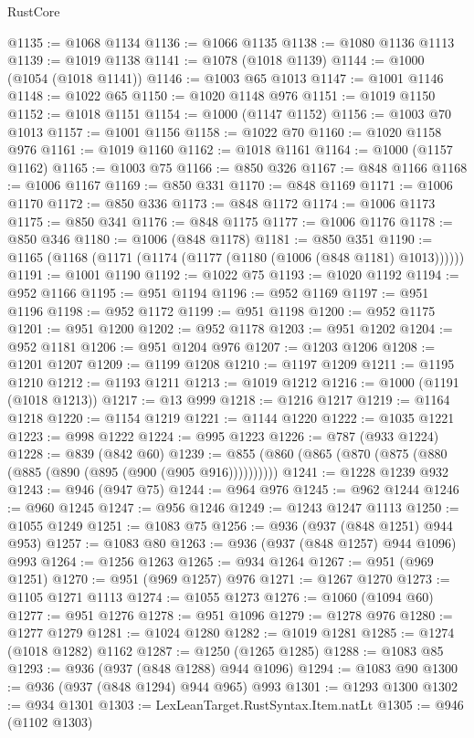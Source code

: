 \begin{lexlean}{RustCore}
\begin{coremodule}
@1135 := @1068 @1134
@1136 := @1066 @1135
@1138 := @1080 @1136 @1113
@1139 := @1019 @1138
@1141 := @1078 (@1018 @1139)
@1144 := @1000 (@1054 (@1018 @1141))
@1146 := @1003 @65 @1013
@1147 := @1001 @1146
@1148 := @1022 @65
@1150 := @1020 @1148 @976
@1151 := @1019 @1150
@1152 := @1018 @1151
@1154 := @1000 (@1147 @1152)
@1156 := @1003 @70 @1013
@1157 := @1001 @1156
@1158 := @1022 @70
@1160 := @1020 @1158 @976
@1161 := @1019 @1160
@1162 := @1018 @1161
@1164 := @1000 (@1157 @1162)
@1165 := @1003 @75
@1166 := @850 @326
@1167 := @848 @1166
@1168 := @1006 @1167
@1169 := @850 @331
@1170 := @848 @1169
@1171 := @1006 @1170
@1172 := @850 @336
@1173 := @848 @1172
@1174 := @1006 @1173
@1175 := @850 @341
@1176 := @848 @1175
@1177 := @1006 @1176
@1178 := @850 @346
@1180 := @1006 (@848 @1178)
@1181 := @850 @351
@1190 := @1165 (@1168 (@1171 (@1174 (@1177 (@1180 (@1006 (@848 @1181) @1013))))))
@1191 := @1001 @1190
@1192 := @1022 @75
@1193 := @1020 @1192
@1194 := @952 @1166
@1195 := @951 @1194
@1196 := @952 @1169
@1197 := @951 @1196
@1198 := @952 @1172
@1199 := @951 @1198
@1200 := @952 @1175
@1201 := @951 @1200
@1202 := @952 @1178
@1203 := @951 @1202
@1204 := @952 @1181
@1206 := @951 @1204 @976
@1207 := @1203 @1206
@1208 := @1201 @1207
@1209 := @1199 @1208
@1210 := @1197 @1209
@1211 := @1195 @1210
@1212 := @1193 @1211
@1213 := @1019 @1212
@1216 := @1000 (@1191 (@1018 @1213))
@1217 := @13 @999
@1218 := @1216 @1217
@1219 := @1164 @1218
@1220 := @1154 @1219
@1221 := @1144 @1220
@1222 := @1035 @1221
@1223 := @998 @1222
@1224 := @995 @1223
@1226 := @787 (@933 @1224)
@1228 := @839 (@842 @60)
@1239 := @855 (@860 (@865 (@870 (@875 (@880 (@885 (@890 (@895 (@900 (@905 @916))))))))))
@1241 := @1228 @1239 @932
@1243 := @946 (@947 @75)
@1244 := @964 @976
@1245 := @962 @1244
@1246 := @960 @1245
@1247 := @956 @1246
@1249 := @1243 @1247 @1113
@1250 := @1055 @1249
@1251 := @1083 @75
@1256 := @936 (@937 (@848 @1251) @944 @953)
@1257 := @1083 @80
@1263 := @936 (@937 (@848 @1257) @944 @1096) @993
@1264 := @1256 @1263
@1265 := @934 @1264
@1267 := @951 (@969 @1251)
@1270 := @951 (@969 @1257) @976
@1271 := @1267 @1270
@1273 := @1105 @1271 @1113
@1274 := @1055 @1273
@1276 := @1060 (@1094 @60)
@1277 := @951 @1276
@1278 := @951 @1096
@1279 := @1278 @976
@1280 := @1277 @1279
@1281 := @1024 @1280
@1282 := @1019 @1281
@1285 := @1274 (@1018 @1282) @1162
@1287 := @1250 (@1265 @1285)
@1288 := @1083 @85
@1293 := @936 (@937 (@848 @1288) @944 @1096)
@1294 := @1083 @90
@1300 := @936 (@937 (@848 @1294) @944 @965) @993
@1301 := @1293 @1300
@1302 := @934 @1301
@1303 := LexLeanTarget.RustSyntax.Item.natLt
@1305 := @946 (@1102 @1303)

\end{coremodule}
\end{lexlean}
